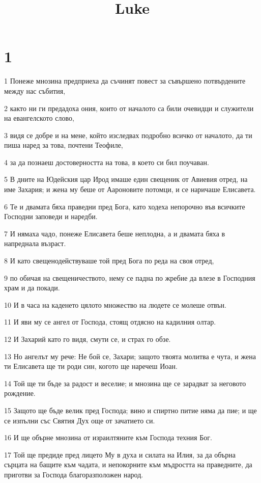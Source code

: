 

\title{Luke}


\chapter{1}

\par 1 Понеже мнозина предприеха да съчинят повест за съвършено потвърдените между нас събития,
\par 2 както ни ги предадоха ония, които от началото са били очевидци и служители на евангелското слово,
\par 3 видя се добре и на мене, който изследвах подробно всичко от началото, да ти пиша наред за това, почтени Теофиле,
\par 4 за да познаеш достоверността на това, в което си бил поучаван.
\par 5 В дните на Юдейския цар Ирод имаше един свещеник от Авиевия отред, на име Захария; и жена му беше от Аароновите потомци, и се наричаше Елисавета.
\par 6 Те и двамата бяха праведни пред Бога, като ходеха непорочно във всичките Господни заповеди и наредби.
\par 7 И нямаха чадо, понеже Елисавета беше неплодна, а и двамата бяха в напреднала възраст.
\par 8 И като свещенодействуваше той пред Бога по реда на своя отред,
\par 9 по обичая на свещеничеството, нему се падна по жребие да влезе в Господния храм и да покади.
\par 10 И в часа на каденето цялото множество на людете се молеше отвън.
\par 11 И яви му се ангел от Господа, стоящ отдясно на кадилния олтар.
\par 12 И Захарий като го видя, смути се, и страх го обзе.
\par 13 Но ангелът му рече: Не бой се, Захари; защото твоята молитва е чута, и жена ти Елисавета ще ти роди син, когото ще наречеш Иоан.
\par 14 Той ще ти бъде за радост и веселие; и мнозина ще се зарадват за неговото рождение.
\par 15 Защото ще бъде велик пред Господа; вино и спиртно питие няма да пие; и ще се изпълни със Святия Дух още от зачатието си.
\par 16 И ще обърне мнозина от израилтяните към Господа техния Бог.
\par 17 Той ще предиде пред лицето Му в духа и силата на Илия, за да обърна сърцата на бащите към чадата, и непокорните към мъдростта на праведните, да приготви за Господа благоразположен народ.
